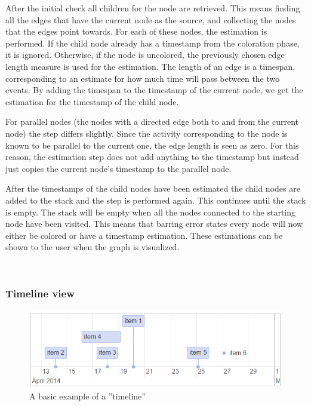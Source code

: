 After the initial check all children for the node are retrieved.
This means finding all the edges that have the current node as the source, and collecting the nodes that the edges point towards.
For each of these nodes, the estimation is performed.
If the child node already has a timestamp from the coloration phase, it is ignored.
Otherwise, if the node is uncolored, the previously chosen edge length measure is used for the estimation. 
The length of an edge is a timespan, corresponding to an estimate for how much time will pass between the two events.
By adding the timespan to the timestamp of the current node, we get the estimation for the timestamp of the child node.

For parallel nodes (the nodes with a directed edge both to and from the current node) the step differs slightly. 
Since the activity corresponding to the node is known to be parallel to the current one, the edge length is seen as zero.
For this reason, the estimation step does not add anything to the timestamp but instead just copies the current node's timestamp to the parallel node.

After the timestamps of the child nodes have been estimated the child nodes are added to the stack and the step is performed again.
This continues until the stack is empty.
The stack will be empty when all the nodes connected to the starting node have been visited.
This means that barring error states every node will now either be colored or have a timestamp estimation.
These estimations can be shown to the user when the graph is visualized.

\\

\subsubsection{Timeline view}

\begin{figure}[htb]
    \centering \includegraphics[width=0.6\linewidth]{gfx/basictimeline.png}
    \caption{A basic example of a ''timeline'' }
    \label{fig:basictimeline}
\end{figure}

